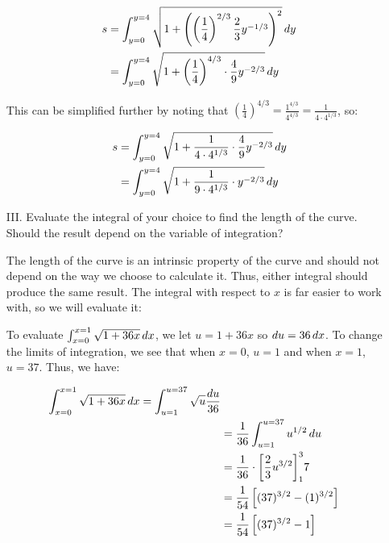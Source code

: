 \documentclass[]{ximera}
\begin{document}
\begin{problem}
\begin{enumerate}
\begin{freeResponse}
\begin{align*}
s &=  \int_{y=0}^{y=4} \sqrt{1+\left(\left(\frac{1}{4}\right)^{2/3} \frac{2}{3} y^{-1/3}\right)^2} \mathop{}\!d y \\
&=  \int_{y=0}^{y=4} \sqrt{1+\left(\frac{1}{4}\right)^{4/3} \cdot  \frac{4}{9} y^{-2/3}} \mathop{}\!d y \\
\end{align*}

This can be simplified further by noting that $\left(\frac{1}{4}\right)^{4/3} = \frac{1^{4/3}}{4^{4/3}} = \frac{1}{4 \cdot 4^{1/3}}$, so:

\begin{align*}
s &=  \int_{y=0}^{y=4} \sqrt{1+ \frac{1}{4 \cdot 4^{1/3}} \cdot  \frac{4}{9} y^{-2/3}}  \mathop{}\!d y \\
&= \int_{y=0}^{y=4} \sqrt{1+ \frac{1}{9\cdot 4^{1/3}} \cdot y^{-2/3}} \mathop{}\!d y \\
\end{align*}

\end{freeResponse}


\item[III.] Evaluate the integral of your choice to find the length of the curve.  Should the result depend on the variable of integration?

\begin{freeResponse}
The length of the curve is an intrinsic property of the curve and should not depend on the way we choose to calculate it.  Thus, either integral should produce the same result.  The integral with respect to $x$ is far easier to work with, so we will evaluate it:

To evaluate $\int_{x=0}^{x=1} \sqrt{1+36x} \mathop{}\!d x$, we let $u=1+36x$ so $\mathop{}\!d u = 36 \mathop{}\!d x$.  To change the limits of integration, we see that when $x=0$, $u=1$ and when $x=1$, $u=37$.  Thus, we have:

\begin{align*}
\int_{x=0}^{x=1} \sqrt{1+36x} \mathop{}\!d x = \int_{u=1}^{u=37} \sqrt{u} \frac{\mathop{}\!d u}{36} \\
&= \frac{1}{36} \int_{u=1}^{u=37} u^{1/2} \mathop{}\!d u \\
&=  \frac{1}{36} \cdot \bigg[ \frac{2}{3} u^{3/2} \bigg]_1^37 \\
& = \frac{1}{54} \left[(37)^{3/2}-(1)^{3/2}\right] \\
&= \frac{1}{54} \left[(37)^{3/2}-1\right] 
\end{align*}


\end{freeResponse}
\end{enumerate} 
\end{problem}
\end{document}
